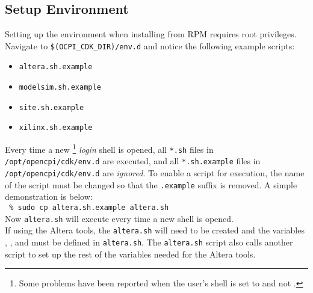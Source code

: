 \subsection{Setup Environment} \label{setenv}
\label{subsec:setup_environment}
\begin{center}
\end{center}

Setting up the environment when installing from RPM requires root privileges. Navigate to \verb+$(OCPI_CDK_DIR)/env.d+ and notice the following example scripts:

\begin{itemize}
 	\item \verb+altera.sh.example+
 	\item \verb+modelsim.sh.example+
 	\item \verb+site.sh.example+
 	\item \verb+xilinx.sh.example+
\end{itemize}

Every time a new \footnote{Some problems have been reported when the user's shell is set to  and not .} \textit{login} shell is opened, all \verb+*.sh+ files in \verb+/opt/opencpi/cdk/env.d+ are executed, and all \verb+*.sh.example+ files in \verb+/opt/opencpi/cdk/env.d+ are \textit{ignored}. To enable a script for execution, the name of the script must be changed so that the \verb+.example+ suffix is removed. A simple demonstration is below:\\

\verb+ % sudo cp altera.sh.example altera.sh+\\

Now \verb+altera.sh+ will execute every time a new shell is opened.\\

If using the Altera tools, the \verb+altera.sh+ will need to be created and the variables , , and  must be defined in \verb+altera.sh+. The \verb+altera.sh+ script also calls another script to set up the rest of the variables needed for the Altera tools.\\

